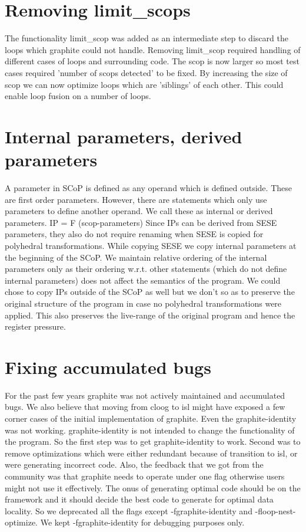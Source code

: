 \section{Removing limit_scops}
The functionality limit_scop was added
as an intermediate step to discard the loops which graphite could not
handle. Removing limit_scop required handling of different cases of loops and
surrounding code.  The scop is now larger so most test cases required 'number of
scops detected' to be fixed. By increasing the size of scop we can now optimize
loops which are 'siblings' of each other. This could enable loop fusion on a
number of loops.



\section{Internal parameters, derived parameters}
A parameter in SCoP is defined as any operand which is defined outside. These are first order parameters.
However, there are statements which only use parameters to define another operand. We call these as internal or
derived parameters.
IP = F (scop-parameters)
Since IPs can be derived from SESE parameters, they also do not require renaming when SESE is copied for polyhedral
transformations. While copying SESE we copy internal parameters at the beginning of the SCoP.
We maintain relative ordering of the internal parameters only as their ordering w.r.t. other
statements (which do not define internal parameters) does not affect the semantics of the program.
We could chose to copy IPs outside of the SCoP as well but we don't so as to preserve the original structure of the
program in case no polyhedral transformations were applied. This also preserves the live-range
of the original program and hence the register pressure.


\section{Fixing accumulated bugs}
For the past few years graphite was not actively maintained and accumulated bugs. We also believe that
moving from cloog to isl might have exposed a few corner cases of the initial implementation of graphite.
Even the graphite-identity was not working. graphite-identity is not intended to change the functionality
of the program. So the first step was to get graphite-identity to work. Second was to remove optimizations which
were either redundant because of transition to isl, or were generating incorrect code. Also, the feedback that we
got from the community was that graphite needs to operate under one flag otherwise users might not use it effectively.
The onus of generating optimal code should be on the framework and it should decide the best code to generate
for optimal data locality. So we deprecated all the flags except -fgraphite-identity and -floop-nest-optimize.
We kept -fgraphite-identity for debugging purposes only.

